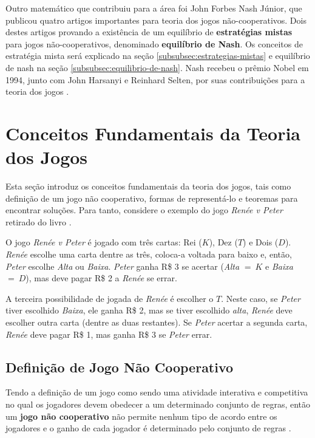 Outro matemático que contribuiu para a área foi John Forbes Nash Júnior, que publicou quatro artigos importantes para teoria dos jogos não-cooperativos. Dois destes artigos provando a existência de um equilíbrio de \textbf{estratégias mistas} para jogos não-cooperativos, denominado \textbf{equilíbrio de Nash}. Os conceitos de estratégia mista será explicado na seção \ref{subsubsec:estrategias-mistas} e equilíbrio de nash na seção \ref{subsubsec:equilibrio-de-nash}. Nash recebeu o prêmio Nobel em 1994, junto com John Harsanyi e Reinhard Selten, por suas contribuições para a teoria dos jogos \cite[p.~3--4]{sartini_IIbienaldasbm}.

\section{Conceitos Fundamentais da Teoria dos Jogos}
\label{sec:conceitos-fundamentais-da-teoria-dos-jogos}

Esta seção introduz os conceitos fundamentais da teoria dos jogos, tais como definição de um jogo não cooperativo, formas de representá-lo e teoremas para encontrar soluções. Para tanto, considere o exemplo do jogo \emph{Renée v Peter} retirado do livro \cite{jones_1980}.

\begin{ex}\label{ex:renee-v-peter}
O jogo \emph{Renée v Peter} é jogado com três cartas: Rei ($K$), Dez ($T$) e Dois ($D$). \emph{Renée} escolhe uma carta dentre as três, coloca-a voltada para baixo e, então, \emph{Peter} escolhe \emph{Alta} ou \emph{Baixa}. \emph{Peter} ganha R\$ 3 se acertar (\emph{Alta} $=\ K$ e \emph{Baixa} $=\ D$), mas deve pagar R\$ 2 a \emph{Renée} se errar.

A terceira possibilidade de jogada de \emph{Renée} é escolher o $T$. Neste caso, se \emph{Peter} tiver escolhido \emph{Baixa}, ele ganha R\$ 2, mas se tiver escolhido \emph{alta}, \emph{Renée} deve escolher outra carta (dentre as duas restantes). Se \emph{Peter} acertar a segunda carta, \emph{Renée} deve pagar R\$ 1, mas ganha R\$ 3 se \emph{Peter} errar.
\end{ex}

\subsection{Definição de Jogo Não Cooperativo}
\label{subsec:definicao-de-jogo-nao-cooperativo}

Tendo a definição de um jogo como sendo uma atividade interativa e competitiva no qual os jogadores devem obedecer a um determinado conjunto de regras, então um \textbf{jogo não cooperativo} não permite nenhum tipo de acordo entre os jogadores e o ganho de cada jogador é determinado pelo conjunto de regras \cite{jones_1980}.

